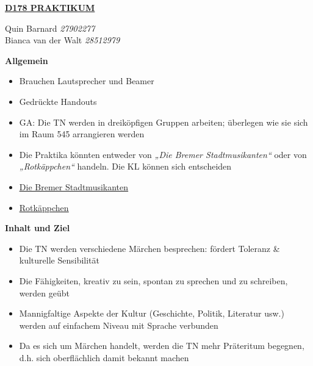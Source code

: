 \documentclass[12pt,a4paper]{article}
\newcommand{\ulhref}[2]{\href{#1}{\uline{#2}}}
\begin{document}
\begin{center}
    \Large{
        \textbf{
            \uline{D178 PRAKTIKUM}
        }
    }
\end{center}

\begin{flushright}
    Quin Barnard \textit{27902277}\\
    Bianca van der Walt \textit{28512979}
\end{flushright}

\large{\textbf{Allgemein}}
\begin{itemize}
    \item Brauchen Lautsprecher und Beamer
    \item Gedrückte Handouts
    \item GA: Die TN werden in dreiköpfigen Gruppen arbeiten; überlegen wie sie sich im Raum 545 arrangieren werden
    \item Die Praktika könnten entweder von \textit{„Die Bremer Stadtmusikanten“} oder von \textit{„Rotkäppchen“} handeln. Die KL können sich entscheiden
    \item \ulhref{https://www.grimmstories.com/de/grimm_maerchen/die_bremer_stadtmusikanten}{Die Bremer Stadtmusikanten}
    \item \ulhref{https://www.grimmstories.com/de/grimm_maerchen/rotkaeppchen}{Rotkäppchen}
\end{itemize}

\large{\textbf{Inhalt und Ziel}}
\begin{itemize}
    \item Die TN werden verschiedene Märchen besprechen: fördert Toleranz \& kulturelle Sensibilität
    \item Die Fähigkeiten, kreativ zu sein, spontan zu sprechen und zu schreiben, werden geübt
    \item Mannigfaltige Aspekte der Kultur (Geschichte, Politik, Literatur usw.) werden auf einfachem Niveau mit Sprache verbunden
    \item Da es sich um Märchen handelt, werden die TN mehr Präteritum begegnen, d.h. sich oberflächlich damit bekannt machen
\end{itemize}
\end{document}
